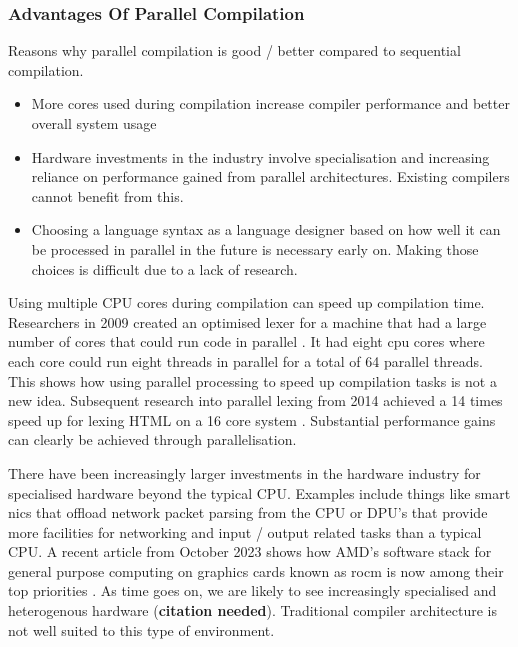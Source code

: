 \subsubsection{Advantages Of Parallel Compilation}
\begin{sectionplan}
     Reasons why parallel compilation is good / better compared to sequential
	 compilation.

     \begin{itemize}
          \item More cores used during compilation increase compiler performance
                and better overall system usage

          \item Hardware investments in the industry involve specialisation
                and increasing reliance on performance gained from parallel
                architectures. Existing compilers cannot benefit from this.

          \item Choosing a language syntax as a language designer based on how
                well it can be processed in parallel in the future is necessary
                early on. Making those choices is difficult due to a lack of
                research.
     \end{itemize}
\end{sectionplan}

Using multiple CPU cores during compilation can speed up compilation time.
Researchers in 2009 created an optimised lexer for a machine that had a large
number of cores that could run code in parallel
\citep{scarpazza_high-performance_2009}. It had eight cpu cores where each core
could run eight threads in parallel for a total of 64 parallel threads.  This
shows how using parallel processing to speed up compilation tasks is not a new
idea. Subsequent research into parallel lexing from 2014 achieved a 14 times
speed up for lexing HTML on a 16 core system
\citep{mytkowicz_data-parallel_2014}. Substantial performance gains can clearly
be achieved through parallelisation.

There have been increasingly larger investments in the hardware industry for
specialised hardware beyond the typical CPU. Examples include things like smart
nics that offload network packet parsing from the CPU or DPU’s that provide
more facilities for networking and input / output related tasks than a typical
CPU. A recent article from October 2023 shows how AMD’s software stack for
general purpose computing on graphics cards known as rocm is now among their
top priorities \citep{ward-foxton_rocm_2023}. As time goes on, we are likely
to see increasingly specialised and heterogenous hardware (\textbf{citation
needed}). Traditional compiler architecture is not well suited to this type
of environment.

